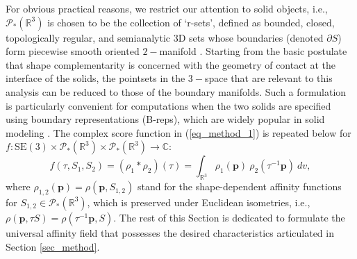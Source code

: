 \documentclass[article]{gmp2014}
\theoremstyle{definition}
\begin{document}
For obvious practical reasons, we restrict our attention to solid objects, i.e., $\mathcal{P}_\ast(\mathds{R}^3)$ is chosen to be the collection of `r-sets', defined as bounded, closed, topologically regular, and semianalytic 3D sets whose boundaries (denoted $\partial S$) form piecewise smooth oriented $2-$manifold \cite{Shapiro2001}. Starting from the basic postulate that shape complementarity is concerned with the geometry of contact at the interface of the solids, the pointsets in the $3-$space that are relevant to this analysis can be reduced to those of the boundary manifolds. Such a formulation is particularly convenient for computations
%
when the two solids are specified using boundary representations (B-reps), which are widely popular in solid modeling \cite{Requicha1980}. The complex score function in (\ref{eq_method_1}) is repeated below for $f: \mathrm{SE}(3) \times \mathcal{P}_\ast(\mathds{R}^3) \times \mathcal{P}_\ast(\mathds{R}^3) \rightarrow \mathds{C}$:
%
\begin{equation}
    f(\tau, S_1, S_2) = (\rho_1 \ast \rho_2) (\tau) = \int_{\mathds{R}^3} \rho_1(\mathbf{p})~\rho_2(\tau^{-1}\mathbf{p})~ dv, \label{eq_form_8}
\end{equation}
%
where $\rho_{1,2}(\mathbf{p}) = \rho(\mathbf{p}, S_{1,2})$ stand for the shape-dependent affinity functions for $S_{1,2} \in \mathcal{P}_\ast(\mathds{R}^3)$, which is preserved under Euclidean isometries, i.e., $\rho(\mathbf{p}, \tau S) = \rho(\tau^{-1}\mathbf{p}, S)$. The rest of this Section is dedicated to formulate the universal affinity field that possesses the desired characteristics articulated in Section \ref{sec_method}.
\end{document}
